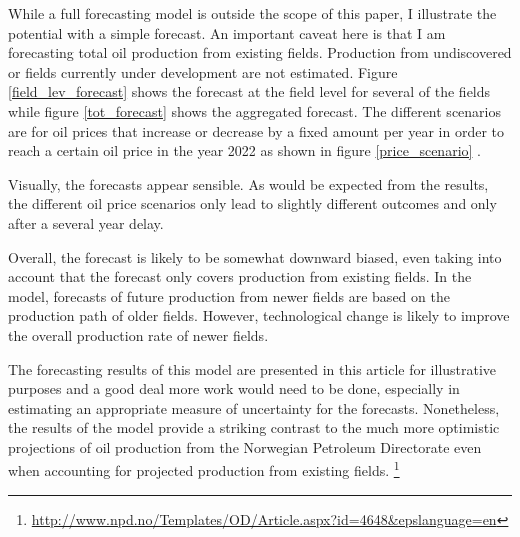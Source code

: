 \documentclass[12pt]{article}
\begin{document}
While a full forecasting model is outside the scope of this paper, I illustrate the potential with a simple forecast.  An important caveat here is that I am forecasting total oil production from existing fields.  Production from undiscovered or fields currently under development are not estimated.  Figure \ref{field_lev_forecast} shows the forecast at the field level for several of the fields while figure \ref{tot_forecast} shows the aggregated forecast.  The different scenarios are for oil prices that increase or decrease by a fixed amount per year in order to reach a certain oil price in the year 2022 as shown in figure \ref{price_scenario} .  

Visually, the forecasts appear sensible.  As would be expected from the results, the different oil price scenarios only lead to slightly different outcomes and only after a several year delay.

Overall, the forecast is likely to be somewhat downward biased, even taking into account that the forecast only covers production from existing fields.  In the model, forecasts of future production from newer fields are based on the production path of older fields.  However, technological change is likely to improve the overall production rate of newer fields.

The forecasting results of this model are presented in this article for illustrative purposes and a good deal more work would need to be done, especially in estimating an appropriate measure of uncertainty for the forecasts.  Nonetheless, the results of the model provide a striking contrast to the much more optimistic projections of oil production from the Norwegian Petroleum Directorate even when accounting for projected production from existing fields. \footnote{\url{http://www.npd.no/Templates/OD/Article.aspx?id=4648&epslanguage=en}}





\FloatBarrier

\appendix
\end{document}
